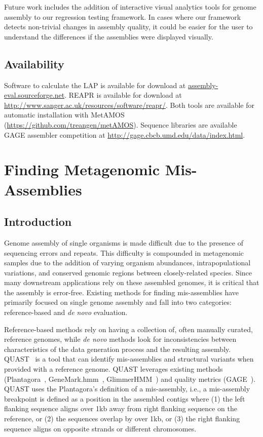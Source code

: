\documentclass[12pt,\mydriver]{thesis}
\begin{document}
Future work includes the addition of interactive visual analytics tools for genome assembly to our regression testing framework.
In cases where our framework detects non-trivial changes in assembly quality, it could be easier for the user to understand the differences if the assemblies were displayed visually.


\section{Availability}
Software to calculate the LAP is available for download at \url{assembly-eval.sourceforge.net}.
REAPR is available for download at \url{http://www.sanger.ac.uk/resources/software/reapr/}.
Both tools are available for automatic installation with MetAMOS (\url{https://github.com/treangen/metAMOS}).
Sequence libraries are available GAGE assembler competition at \url{http://gage.cbcb.umd.edu/data/index.html}.
\clearpage{}
\clearpage{}\renewcommand{\thechapter}{5}

\chapter{Finding Metagenomic Mis-Assemblies}

\section{Introduction}

Genome assembly of single organisms is made difficult due to the presence of sequencing errors and repeats.
This difficulty is compounded in metagenomic samples due to the addition of varying organism abundances, intrapopulational variations, and conserved genomic regions between closely-related species.
Since many downstream applications rely on these assembled genomes, it is critical that the assembly is error-free.
Existing methods for finding mis-assemblies have primarily focused on single genome assembly and fall into two categories: reference-based and \emph{de novo} evaluation.

Reference-based methods rely on having a collection of, often manually curated, reference genomes, while \emph{de novo} methods look for inconsistencies between characteristics of the data generation process and the resulting assembly.
QUAST~\cite{gurevich2013quast} is a tool that can identify mis-assemblies and structural variants when provided with a reference genome.
QUAST leverages existing methods (Plantagora~\cite{barthelson2011plantagora},
GeneMark.hmm~\cite{lukashin1998genemark}, GlimmerHMM~\cite{majoros2004tigrscan}) and quality metrics (GAGE~\cite{salzberg2011gage}).
QUAST uses the Plantagora’s definition of a mis-assembly,
i.e., a mis-assembly breakpoint is defined as a position in the assembled contigs where (1) the left flanking
sequence aligns over 1kb away from right flanking sequence on the reference, or (2) the sequences overlap by
over 1kb, or (3) the right flanking sequence aligns on opposite strands or different chromosomes.
\end{document}
